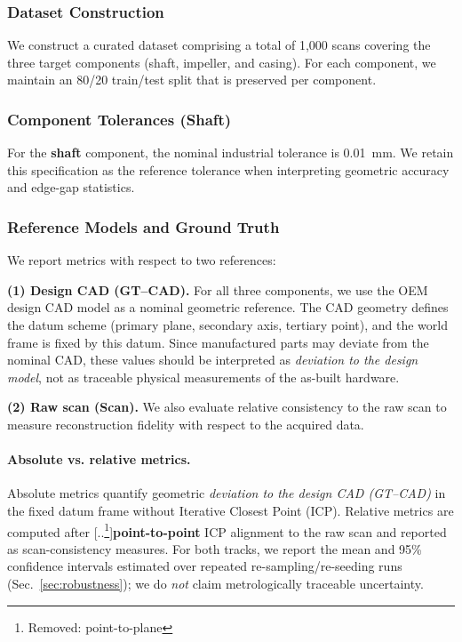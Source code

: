\documentclass{ieeeaccess}
\providecommand{\DIFaddtex}[1]{{\color{blue}\bfseries #1}} %
\providecommand{\DIFdeltex}[1]{{\color{red}[..\footnote{\color{black}Removed: #1}]}} %
\providecommand{\DIFaddbegin}{} %
\providecommand{\DIFaddend}{} %
\providecommand{\DIFdelbegin}{} %
\providecommand{\DIFdelend}{} %
\providecommand{\DIFadd}[1]{\texorpdfstring{\DIFaddtex{#1}}{#1}} %
\providecommand{\DIFdel}[1]{\texorpdfstring{\DIFdeltex{#1}}{}} %
\begin{document}
\subsubsection{Dataset Construction}
We construct a curated dataset comprising a total of 1,000 scans covering the three target components (shaft, impeller, and casing). For each component, we maintain an 80/20 train/test split that is preserved per component.

\subsubsection{Component Tolerances (Shaft)}
For the \textbf{shaft} component, the nominal industrial tolerance is
\SI{0.01}{\milli\meter}. We retain this specification as the reference
tolerance when interpreting geometric accuracy and edge-gap statistics.

\subsubsection{Reference Models and Ground Truth}
\label{sec:gt}

We report metrics with respect to two references:

\noindent\textbf{(1) Design CAD (GT--CAD).}
For all three components, we use the OEM design CAD model as a nominal geometric reference. The CAD geometry defines the datum scheme (primary plane, secondary axis, tertiary point), and the world frame is fixed by this datum. Since manufactured parts may deviate from the nominal CAD, these values should be interpreted as \emph{deviation to the design model}, not as traceable physical measurements of the as-built hardware.

\noindent\textbf{(2) Raw scan (Scan).}
We also evaluate relative consistency to the raw scan to measure reconstruction fidelity with respect to the acquired data.

\paragraph*{Absolute vs. relative metrics.}
Absolute metrics quantify geometric \emph{deviation to the design CAD (GT--CAD)} in the fixed datum frame without Iterative Closest Point (ICP). Relative metrics are computed after \DIFdelbegin \DIFdel{point-to-plane }\DIFdelend \DIFaddbegin \DIFadd{point-to-point }\DIFaddend ICP alignment to the raw scan and reported as scan-consistency measures. For both tracks, we report the mean and 95\% confidence intervals estimated over repeated re-sampling/re-seeding runs (Sec.~\ref{sec:robustness}); we do \emph{not} claim metrologically traceable uncertainty.
\end{document}
